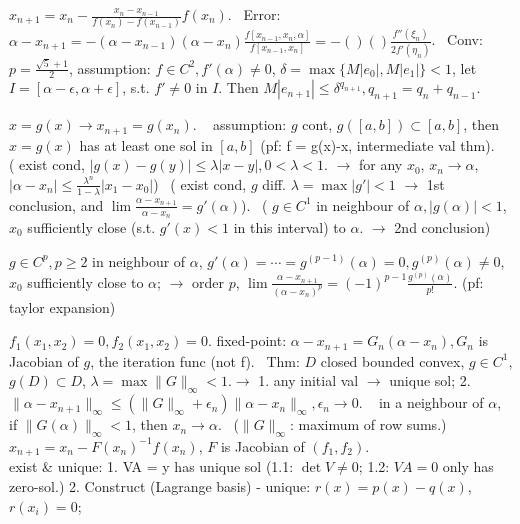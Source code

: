  $x_{n+1} = x_n - \frac{x_n-x_{n-1}}{f(x_n)-f(x_{n-1})}f(x_n) $. ~Error: $\alpha-x_{n+1} = -(\alpha-x_{n-1})(\alpha-x_n)\frac{f[x_{n-1}, x_n, \alpha]}{f[x_{n-1}, x_n]} = -()()\frac{f''(\xi_n)}{2f'(\eta_n)}$. ~Conv: $p = \frac{\sqrt{5}+1}{2}$, assumption: $f\in C^2, f'(\alpha) \ne 0$, $\delta = \max\{M|e_0|, M|e_1|\} < 1$, let $I = [\alpha-\epsilon, \alpha+\epsilon]$, s.t. $f'\ne 0$ in $I$. Then $M|e_{n+1}|\le \delta^{q_{n+1}}, q_{n+1} = q_n+q_{n-1} $.

 $x = g(x) \to x_{n+1}=g(x_n) $. ~ assumption: $g$ cont, $g([a, b])\subset [a, b]$, then $x = g(x)$ has at least one sol in $[a, b]$ (pf: f = g(x)-x, intermediate val thm). ~ ( exist cond, $|g(x)-g(y)| \le \lambda|x-y|, 0<\lambda < 1$. $\to$ for any $x_0 $, $x_n\to\alpha$, $|\alpha - x_n| \le \frac{\lambda^n}{1-\lambda}|x_1-x_0|$) ~( exist cond, $g$ diff. $\lambda = \max|g'| < 1$ $\to$ 1st conclusion, and $\lim\frac{\alpha-x_{n+1}}{\alpha-x_n} = g'(\alpha)$). ~( $g\in C^1 $ in neighbour of $\alpha, |g(\alpha)| < 1$, $x_0$ sufficiently close (s.t. $g'(x) < 1$ in this interval) to $\alpha$. $\to$ 2nd conclusion)

 $g\in C^{p}, p\ge 2 $ in neighbour of $\alpha$, $g'(\alpha) = \cdots = g^{(p-1)}(\alpha) = 0, g^{(p)}(\alpha)\ne 0 $, $x_0$ sufficiently close to $\alpha$; $\to$ order $p$, $\lim\frac{\alpha-x_{n+1}}{(\alpha-x_n)^p} = (-1)^{p-1}\frac{g^{(p)}(\alpha)}{p!} $. (pf: taylor expansion)

 $f_1(x_1, x_2) = 0, f_2(x_1, x_2) = 0 $. fixed-point: $\alpha-x_{n+1} = G_n(\alpha-x_n), G_n $ is Jacobian of $g$, the iteration func (not f). ~Thm: $D$ closed bounded convex, $g\in C^1 $, $g(D)\subset D$, $\lambda = \max\lVert G\rVert_\infty < 1. \to $ 1. any initial val $\to$ unique sol; 2. $\lVert \alpha-x_{n+1}\rVert_{\infty} \le (\lVert G\rVert_\infty +\epsilon_n)\lVert \alpha-x_{n}\rVert_{\infty}, \epsilon_n\to 0 $. ~ in a neighbour of $\alpha$, if $\lVert G(\alpha)\rVert_{\infty} < 1$, then $x_n\to \alpha $. ~($\lVert G\rVert_{\infty}$: maximum of row sums.) ~ $x_{n+1} = x_n-F(x_n)^{-1}f(x_n) $, $F$ is Jacobian of $(f_1, f_2) $. \\[5pt]

 exist \& unique: 1. VA = y has unique sol (1.1: $\det V\ne 0$; 1.2: $VA=0$ only has zero-sol.) 2. Construct (Lagrange basis) - unique: $r(x)=p(x)-q(x)$, $r(x_i) = 0$;


